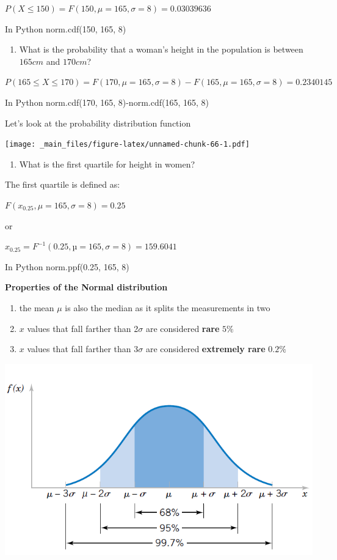 \documentclass[
]{book}
\providecommand{\tightlist}{%
  \setlength{\itemsep}{0pt}\setlength{\parskip}{0pt}}
\begin{document}
\(P(X\le 150)=F(150, \mu=165, \sigma=8)=0.03039636\)

In Python norm.cdf(150, 165, 8)

\begin{enumerate}
\def\labelenumi{\arabic{enumi})}
\setcounter{enumi}{1}
\tightlist
\item
  What is the probability that a woman's height in the population is between \(165cm\) and \(170cm\)?
\end{enumerate}

\(P(165 \le X \le 170)=F(170, \mu=165, \sigma=8)-F(165, \mu=165, \sigma=8)=0.2340145\)

In Python norm.cdf(170, 165, 8)-norm.cdf(165, 165, 8)

Let's look at the probability distribution function

\texttt{[image: \_main\_files/figure-latex/unnamed-chunk-66-1.pdf]}

\begin{enumerate}
\def\labelenumi{\arabic{enumi})}
\setcounter{enumi}{2}
\tightlist
\item
  What is the first quartile for height in women?
\end{enumerate}

The first quartile is defined as:

\(F(x_{0.25}, \mu=165, \sigma=8)=0.25\)

or

\(x_{0.25}=F^{-1}(0.25, µ=165, \sigma=8)=159.6041\)

In Python norm.ppf(0.25, 165, 8)

\textbf{Properties of the Normal distribution}

\begin{enumerate}
\def\labelenumi{\arabic{enumi})}
\item
  the mean \(\mu\) is also the median as it splits the measurements in two
\item
  \(x\) values that fall farther than 2\(\sigma\) are considered \textbf{rare} \(5\%\)
\item
  \(x\) values that fall farther than 3\(\sigma\) are considered \textbf{extremely rare} \(0.2\%\)
\end{enumerate}

\includegraphics{./figures/probs.png}
\end{document}
